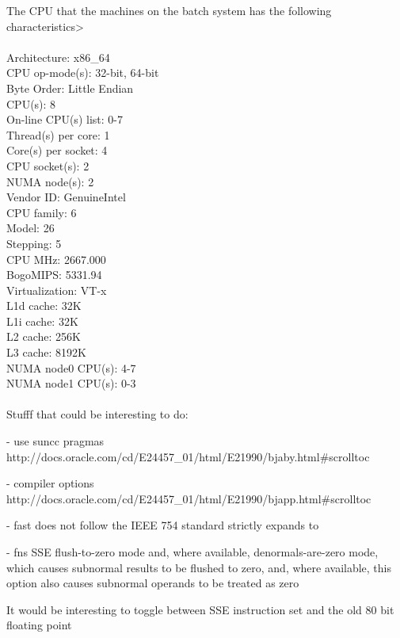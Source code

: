 The CPU that the machines on the batch system has the following characteristics>
\\ \\
Architecture:          x86\_64 \\
CPU op-mode(s):        32-bit, 64-bit \\
Byte Order:            Little Endian\\
CPU(s):                8\\
On-line CPU(s) list:   0-7\\
Thread(s) per core:    1\\
Core(s) per socket:    4\\
CPU socket(s):         2\\
NUMA node(s):          2\\
Vendor ID:             GenuineIntel\\
CPU family:            6\\
Model:                 26\\
Stepping:              5\\
CPU MHz:               2667.000\\
BogoMIPS:              5331.94\\
Virtualization:        VT-x\\
L1d cache:             32K\\
L1i cache:             32K\\
L2 cache:              256K\\
L3 cache:              8192K\\
NUMA node0 CPU(s):     4-7\\
NUMA node1 CPU(s):     0-3\\
\\
Stufff that could be interesting to do:

- use suncc pragmas
http://docs.oracle.com/cd/E24457_01/html/E21990/bjaby.html#scrolltoc

- compiler options
http://docs.oracle.com/cd/E24457_01/html/E21990/bjapp.html#scrolltoc

- fast  does not follow the IEEE 754 standard strictly
expands to 

- fns  SSE flush-to-zero mode and, where available, denormals-are-zero mode, which causes subnormal results to be flushed to zero, and, where available, this option also causes subnormal operands to be treated as zero

It would be interesting to toggle between SSE instruction set and the old 80 bit floating point

